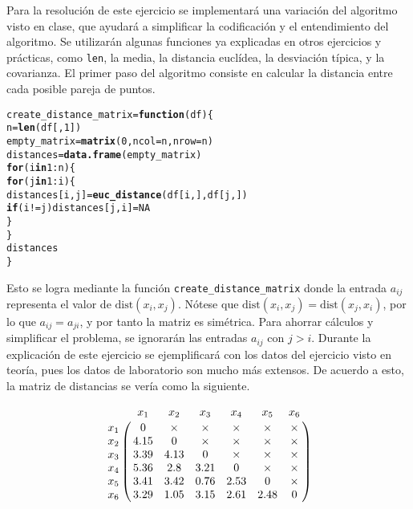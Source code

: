 \documentclass[12pt]{report}\usepackage[]{graphicx}\usepackage[dvipsnames]{xcolor}
\makeatletter
\newcommand{\hlnum}[1]{\textcolor[rgb]{0.686,0.059,0.569}{#1}}%
\newcommand{\hlopt}[1]{\textcolor[rgb]{0,0,0}{#1}}%
\newcommand{\hlstd}[1]{\textcolor[rgb]{0.345,0.345,0.345}{#1}}%
\newcommand{\hlkwa}[1]{\textcolor[rgb]{0.161,0.373,0.58}{\textbf{#1}}}%
\newcommand{\hlkwb}[1]{\textcolor[rgb]{0.69,0.353,0.396}{#1}}%
\newcommand{\hlkwc}[1]{\textcolor[rgb]{0.333,0.667,0.333}{#1}}%
\newcommand{\hlkwd}[1]{\textcolor[rgb]{0.737,0.353,0.396}{\textbf{#1}}}%
\newenvironment{kframe}{%
 \def\at@end@of@kframe{}%
 \ifinner\ifhmode%
  \def\at@end@of@kframe{\end{minipage}}%
  \begin{minipage}{\columnwidth}%
 \fi\fi%
 \def\FrameCommand##1{\hskip\@totalleftmargin \hskip-\fboxsep
 \colorbox{shadecolor}{##1}\hskip-\fboxsep
     \hskip-\linewidth \hskip-\@totalleftmargin \hskip\columnwidth}%
 \MakeFramed {\advance\hsize-\width
   \@totalleftmargin\z@ \linewidth\hsize
   \@setminipage}}%
 {\par\unskip\endMakeFramed%
 \at@end@of@kframe}
\newenvironment{knitrout}{}{} %
\newcommand{\dt}{\text{dist}}
\makeatother
\begin{document}
		 		Para la resolución de este ejercicio se implementará una variación del algoritmo visto en clase, que ayudará a simplificar la codificación y el entendimiento del algoritmo. Se utilizarán algunas funciones ya explicadas en otros ejercicios y prácticas, como \texttt{len}, la media, la distancia euclídea, la desviación típica, y la covarianza. El primer paso del algoritmo consiste en calcular la distancia entre cada posible pareja de puntos. 
		 		
\begin{knitrout}
\color{fgcolor}\begin{kframe}
\begin{alltt}
\hlstd{create_distance_matrix} \hlkwb{=} \hlkwa{function}\hlstd{(}\hlkwc{df}\hlstd{) \{}
        \hlstd{n} \hlkwb{=} \hlkwd{len}\hlstd{(df[,}\hlnum{1}\hlstd{])}
        \hlstd{empty_matrix} \hlkwb{=} \hlkwd{matrix}\hlstd{(}\hlnum{0}\hlstd{,} \hlkwc{ncol} \hlstd{= n,} \hlkwc{nrow} \hlstd{= n)}
        \hlstd{distances} \hlkwb{=} \hlkwd{data.frame}\hlstd{(empty_matrix)}
        \hlkwa{for} \hlstd{(i} \hlkwa{in} \hlnum{1}\hlopt{:}\hlstd{n) \{}
                \hlkwa{for} \hlstd{(j} \hlkwa{in} \hlnum{1}\hlopt{:}\hlstd{i) \{}
                        \hlstd{distances[i, j]} \hlkwb{=} \hlkwd{euc_distance}\hlstd{(df[i,], df[j,])}
                        \hlkwa{if} \hlstd{(i} \hlopt{!=} \hlstd{j) distances[j, i]} \hlkwb{=} \hlnum{NA}
                \hlstd{\}}
        \hlstd{\}}
        \hlstd{distances}
\hlstd{\}}
\end{alltt}
\end{kframe}
\end{knitrout}
		 		
		 		Esto se logra mediante la función \texttt{create\_distance\_matrix} donde la entrada $a_{ij}$ representa el valor de $\dt(x_i, x_j)$. Nótese que $\dt(x_i, x_j) = \dt(x_j, x_i)$, por lo que $a_{ij} = a_{ji}$, y por tanto la matriz es simétrica. Para ahorrar cálculos y simplificar el problema, se ignorarán las entradas $a_{ij}$ con $j > i$. Durante la explicación de este ejercicio se ejemplificará con los datos del ejercicio visto en teoría, pues los datos de laboratorio son mucho más extensos. De acuerdo a esto, la matriz de distancias se vería como la siguiente. 
		 		
		 		$$
		 		\bordermatrix{
		 			& x_1 & x_2 & x_3 & x_4 & x_5 & x_6 \cr
		 			x_1 & 0 & \times & \times & \times & \times & \times\cr
		 			x_2 & 4.15 & 0 & \times & \times & \times & \times\cr
		 			x_3 & 3.39 & 4.13 & 0 & \times & \times & \times\cr
		 			x_4 & 5.36 & 2.8 & 3.21 & 0 & \times & \times\cr
		 			x_5 & 3.41 & 3.42 & 0.76 & 2.53 & 0 & \times\cr
		 			x_6 & 3.29 & 1.05 & 3.15 & 2.61 & 2.48 & 0
		 		}
		 		$$
		 		
\end{document}
